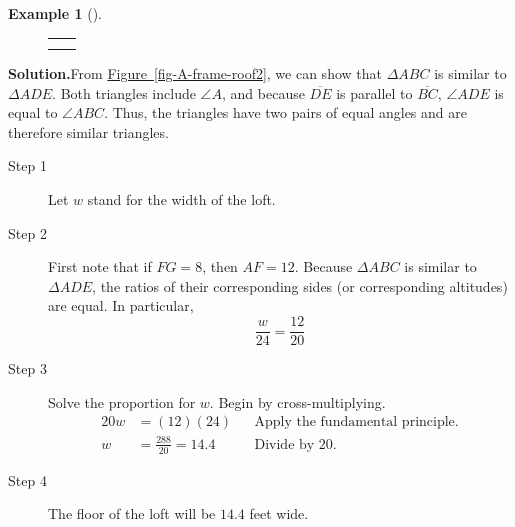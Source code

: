 \documentclass[10pt,]{book}
\theoremstyle{plain}
\theoremstyle{definition}
\theoremstyle{definition}
\newtheorem{example}[theorem]{Example}
\theoremstyle{definition}
\numberwithin{equation}{part}
\newlength{\panelmax}
\newcommand{\amp}{&}
\begin{document}
\begin{example}[]
{\setlength{\tabcolsep}{0.0375\textwidth}
\begin{figure}
\hspace*{0.0375\textwidth}%
\begin{tabular}{@{}*{2}{c}@{}}
\begin{minipage}[c][\panelmax][t]{0.45\textwidth}\usebox{\panelboxAXimage}\end{minipage}&
\begin{minipage}[c][\panelmax][t]{0.4\textwidth}\usebox{\panelboxAYimage}\end{minipage}\tabularnewline
\parbox[t]{0.45\textwidth}{
}&
\parbox[t]{0.4\textwidth}{
}\end{tabular}
\end{figure}
}%
\par\medskip\noindent%
\textbf{Solution.}\quad From \hyperref[fig-A-frame-roof2]{Figure~\ref{fig-A-frame-roof2}}, we can show that \(\Delta ABC\) is similar to \(\Delta ADE\). Both triangles include \(\angle A\), and because \(\overline{DE}\) is parallel to \(\overline{BC} \), \(\angle ADE\) is equal to \(\angle ABC\). Thus, the triangles have two pairs of equal angles and are therefore similar triangles. \leavevmode%
\begin{description}
\item[{Step 1}]\hypertarget{li-370}{}Let \(w\) stand for the width of the loft.%
\item[{Step 2}]\hypertarget{li-371}{}First note that if \(FG = 8\), then \(AF = 12\). Because \(\Delta ABC\) is similar to \(\Delta ADE\), the ratios of their corresponding sides (or corresponding altitudes) are equal. In particular,%
\begin{equation*}
\frac{w}{24}=\frac{12}{20}  
\end{equation*}
%
\item[{Step 3}]\hypertarget{li-372}{}Solve the proportion for \(w\). Begin by cross-multiplying.%
\begin{align*}
20w \amp = (12)(24)\amp\amp\text{Apply the fundamental principle.}
\\
w \amp = \frac{288}{20}= 14.4\amp\amp\text{Divide by 20.}
\end{align*}
%
\item[{Step 4}]\hypertarget{li-373}{}The floor of the loft will be \(14.4\) feet wide.%
\end{description}
%
\end{example}
\typeout{************************************************}
\typeout{************************************************}
\end{document}

